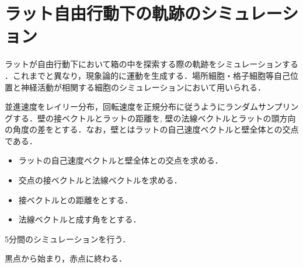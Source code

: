 \section{ラット自由行動下の軌跡のシミュレーション}
ラットが自由行動下において箱の中を探索する際の軌跡をシミュレーションする \citep{Raudies2012-gp}．これまでと異なり，現象論的に運動を生成する．場所細胞・格子細胞等自己位置と神経活動が相関する細胞のシミュレーションにおいて用いられる．


並進速度をレイリー分布，回転速度を正規分布に従うようにランダムサンプリングする．壁の接ベクトルとラットの距離を, 壁の法線ベクトルとラットの頭方向の角度の差をとする．なお，壁とはラットの自己速度ベクトルと壁全体との交点である．

\begin{itemize}
\item ラットの自己速度ベクトルと壁全体との交点を求める．
\item 交点の接ベクトルと法線ベクトルを求める．
\item 接ベクトルとの距離をとする．
\item 法線ベクトルと成す角をとする．
\end{itemize}


5分間のシミュレーションを行う．

黒点から始まり，赤点に終わる．


